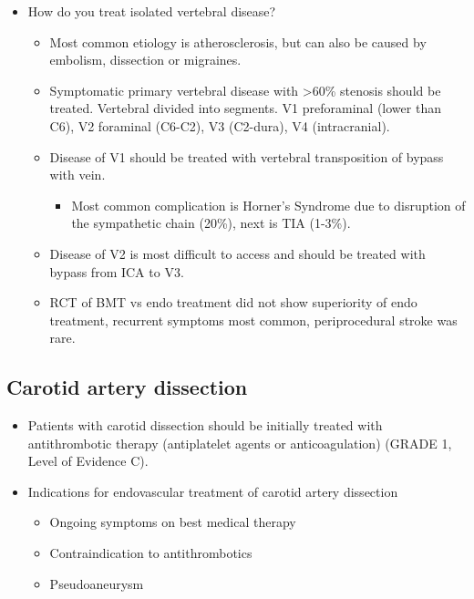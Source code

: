 \documentclass[
]{book}
\providecommand{\tightlist}{%
  \setlength{\itemsep}{0pt}\setlength{\parskip}{0pt}}
\begin{document}
\begin{itemize}
\item
  How do you treat isolated vertebral disease?

  \begin{itemize}
  \tightlist
  \item
    Most common etiology is atherosclerosis, but can also be caused
    by embolism, dissection or migraines.\citep{limaneto2017}
  \item
    Symptomatic primary vertebral disease with \textgreater60\% stenosis should
    be treated. Vertebral divided into segments. V1 preforaminal
    (lower than C6), V2 foraminal (C6-C2), V3 (C2-dura), V4
    (intracranial).\citep{morasch2019, berguer1998}
  \item
    Disease of V1 should be treated with vertebral transposition of
    bypass with vein.\citep{rangel-castilla2015}

    \begin{itemize}
    \tightlist
    \item
      Most common complication is Horner's Syndrome due to
      disruption of the sympathetic chain (20\%), next is TIA
      (1-3\%).\citep{coleman2013, ramirez2012}
    \end{itemize}
  \item
    Disease of V2 is most difficult to access and should be treated
    with bypass from ICA to V3.\citep{berguer1985}
  \item
    RCT of BMT vs endo treatment did not show superiority of endo
    treatment, recurrent symptoms most common, periprocedural stroke
    was rare.\citep{antoniou2012, coward2007}
  \end{itemize}
\end{itemize}

\hypertarget{carotid-artery-dissection}{%
\subsection{Carotid artery dissection}\label{carotid-artery-dissection}}

\begin{itemize}
\tightlist
\item
  Patients with carotid dissection should be initially treated with
  antithrombotic therapy (antiplatelet agents or anticoagulation)
  (GRADE 1, Level of Evidence C).
\item
  Indications for endovascular treatment of carotid artery dissection
  \citep{cohenSinglecenterExperienceEndovascular2012, markusAntiplateletTherapyVs2019a, phamEndovascularStentingExtracranial2011}

  \begin{itemize}
  \item
    Ongoing symptoms on best medical therapy
  \item
    Contraindication to antithrombotics
  \item
    Pseudoaneurysm
  \end{itemize}
\end{itemize}
\end{document}
